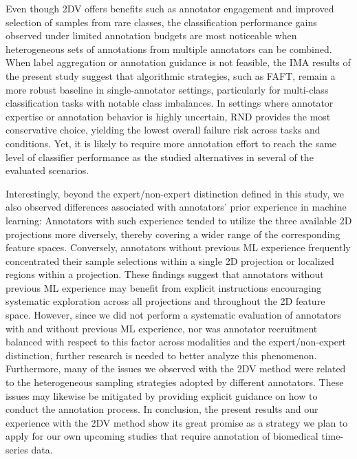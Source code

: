 \documentclass[a4paper,fleqn]{cas-dc}
\begin{document}
Even though 2DV offers benefits such as annotator engagement and improved selection of samples from rare classes, the classification performance gains observed under limited annotation budgets are most noticeable when heterogeneous sets of annotations from multiple annotators can be combined. When label aggregation or annotation guidance is not feasible, the IMA results of the present study suggest that algorithmic strategies, such as FAFT, remain a more robust baseline in single-annotator settings, particularly for multi-class classification tasks with notable class imbalances. In settings where annotator expertise or annotation behavior is highly uncertain, RND provides the most conservative choice, yielding the lowest overall failure risk across tasks and conditions. Yet, it is likely to require more annotation effort to reach the same level of classifier performance as the studied alternatives in several of the evaluated scenarios.

Interestingly, beyond the expert/non-expert distinction defined in this study, we also observed differences associated with annotators' prior experience in machine learning: Annotators with such experience tended to utilize the three available 2D projections more diversely, thereby covering a wider range of the corresponding feature spaces. Conversely, annotators without previous ML experience frequently concentrated their sample selections within a single 2D projection or localized regions within a projection. These findings suggest that annotators without previous ML experience may benefit from explicit instructions encouraging systematic exploration across all projections and throughout the 2D feature space. However, since we did not perform a systematic evaluation of annotators with and without previous ML experience, nor was annotator recruitment balanced with respect to this factor across modalities and the expert/non-expert distinction, further research is needed to better analyze this phenomenon. Furthermore, many of the issues we observed with the 2DV method were related to the heterogeneous sampling strategies adopted by different annotators. These issues may likewise be mitigated by providing explicit guidance on how to conduct the annotation process. In conclusion, the present results and our experience with the 2DV method show its great promise as a strategy we plan to apply for our own upcoming studies that require annotation of biomedical time-series data.



\printcredits
\end{document}
